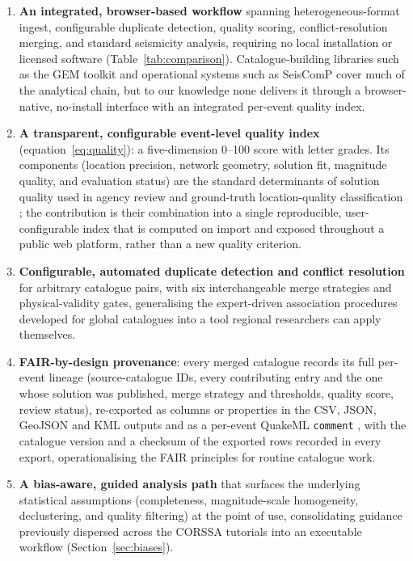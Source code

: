 \documentclass[12pt]{article}
\begin{document}
\begin{enumerate}[leftmargin=*]
  \item \textbf{An integrated, browser-based workflow} spanning
    heterogeneous-format ingest, configurable duplicate detection, quality
    scoring, conflict-resolution merging, and standard seismicity analysis,
    requiring no local installation or licensed software
    (Table~\ref{tab:comparison}).  Catalogue-building libraries such as the
    GEM toolkit \citep{oqmbtk} and operational systems such as SeisComP
    \citep{seiscomp2008} cover much of the analytical chain, but to our
    knowledge none delivers it through a browser-native, no-install interface
    with an integrated per-event quality index.
  \item \textbf{A transparent, configurable event-level quality index}
    (equation~\eqref{eq:quality}): a five-dimension 0--100 score with letter
    grades.  Its components (location precision, network geometry, solution
    fit, magnitude quality, and evaluation status) are the standard
    determinants of solution quality used in agency review and ground-truth
    location-quality classification \citep{bondar2004,woessner2005,warrensmith2025};
    the contribution is their combination into a single reproducible,
    user-configurable index that is computed on import and exposed throughout a
    public web platform, rather than a new quality criterion.
  \item \textbf{Configurable, automated duplicate detection and conflict
    resolution} for arbitrary catalogue pairs, with six interchangeable merge
    strategies and physical-validity gates, generalising the expert-driven
    association procedures developed for global catalogues
    \citep{storchak2013,engdahl1998,yeck2019} into a tool regional researchers
    can apply themselves.
  \item \textbf{FAIR-by-design provenance}: every merged catalogue records its
    full per-event lineage (source-catalogue IDs, every contributing entry and
    the one whose solution was published, merge strategy and thresholds, quality
    score, review status), re-exported as columns or properties in the CSV, JSON, GeoJSON and
    KML outputs and as a per-event QuakeML \texttt{comment}
    \citep{schorlemmer2011}, with the catalogue version and a checksum of the
    exported rows recorded in every export, operationalising the FAIR principles
    \citep{wilkinson2016} for routine catalogue work.
  \item \textbf{A bias-aware, guided analysis path} that surfaces the
    underlying statistical assumptions (completeness, magnitude-scale
    homogeneity, declustering, and quality filtering) at the point of use,
    consolidating guidance previously dispersed across the CORSSA tutorials
    \citep{naylor2010,mignan2012,vanstiphout2012} into an executable workflow
    (Section~\ref{sec:biases}).
\end{enumerate}
\end{document}
